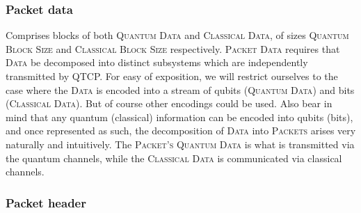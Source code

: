 \documentclass[aps,rmp,twocolumn,amsmath,amssymb,nofootinbib,superscriptaddress,longbibliography,floatfix,table-of-contents,eqsecnum]{revtex4-1}
\begin{document}
%
%

\subsubsection{Packet data} 

Comprises blocks of both \textsc{Quantum Data} and \textsc{Classical Data}, of sizes \textsc{Quantum Block Size} and \textsc{Classical Block Size} respectively. \textsc{Packet Data} requires that \textsc{Data} be decomposed into distinct subsystems which are independently transmitted by QTCP. For easy of exposition, we will restrict ourselves to the case where the \textsc{Data} is encoded into a stream of qubits (\textsc{Quantum Data}) and bits (\textsc{Classical Data}). But of course other encodings could be used. Also bear in mind that any quantum (classical) information can be encoded into qubits (bits), and once represented as such, the decomposition of \textsc{Data} into \textsc{Packets} arises very naturally and intuitively. The \textsc{Packet's} \textsc{Quantum Data} is what is transmitted via the quantum channels, while the \textsc{Classical Data} is communicated via classical channels.

%
%

\subsubsection{Packet header} \label{sec:packet_header} 
\end{document}
